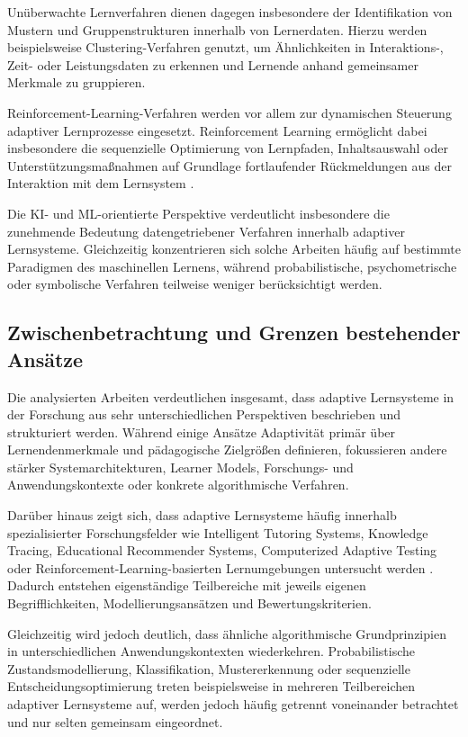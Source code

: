 Unüberwachte Lernverfahren dienen dagegen insbesondere der
Identifikation von Mustern und Gruppenstrukturen innerhalb von
Lernerdaten. Hierzu werden beispielsweise Clustering-Verfahren genutzt,
um Ähnlichkeiten in Interaktions-, Zeit- oder Leistungsdaten zu erkennen
und Lernende anhand gemeinsamer Merkmale zu gruppieren.

Reinforcement-Learning-Verfahren werden vor allem zur dynamischen
Steuerung adaptiver Lernprozesse eingesetzt. Reinforcement Learning
ermöglicht dabei insbesondere die sequenzielle Optimierung von
Lernpfaden, Inhaltsauswahl oder Unterstützungsmaßnahmen auf Grundlage
fortlaufender Rückmeldungen aus der Interaktion mit dem Lernsystem
\citep{Hariyanto2025}.

Die KI- und ML-orientierte Perspektive verdeutlicht insbesondere die
zunehmende Bedeutung datengetriebener Verfahren innerhalb adaptiver
Lernsysteme. Gleichzeitig konzentrieren sich solche Arbeiten häufig auf
bestimmte Paradigmen des maschinellen Lernens, während probabilistische,
psychometrische oder symbolische Verfahren teilweise weniger
berücksichtigt werden.

\subsection{Zwischenbetrachtung und Grenzen bestehender
Ansätze}\label{zwischenbetrachtung-und-grenzen-bestehender-ansuxe4tze}

Die analysierten Arbeiten verdeutlichen insgesamt, dass adaptive
Lernsysteme in der Forschung aus sehr unterschiedlichen Perspektiven
beschrieben und strukturiert werden. Während einige Ansätze Adaptivität
primär über Lernendenmerkmale und pädagogische Zielgrößen definieren,
fokussieren andere stärker Systemarchitekturen, Learner Models,
Forschungs- und Anwendungskontexte oder konkrete algorithmische
Verfahren.

Darüber hinaus zeigt sich, dass adaptive Lernsysteme häufig innerhalb
spezialisierter Forschungsfelder wie Intelligent Tutoring Systems,
Knowledge Tracing, Educational Recommender Systems, Computerized
Adaptive Testing oder Reinforcement-Learning-basierten Lernumgebungen
untersucht werden
\citep{Desmarais2012, Abdelrahman2023, daSilva2023, Liu2024, Riedmann2025}.
Dadurch entstehen eigenständige Teilbereiche mit jeweils eigenen
Begrifflichkeiten, Modellierungsansätzen und Bewertungskriterien.

Gleichzeitig wird jedoch deutlich, dass ähnliche algorithmische
Grundprinzipien in unterschiedlichen Anwendungskontexten wiederkehren.
Probabilistische Zustandsmodellierung, Klassifikation, Mustererkennung
oder sequenzielle Entscheidungsoptimierung treten beispielsweise in
mehreren Teilbereichen adaptiver Lernsysteme auf, werden jedoch häufig
getrennt voneinander betrachtet und nur selten gemeinsam eingeordnet.

